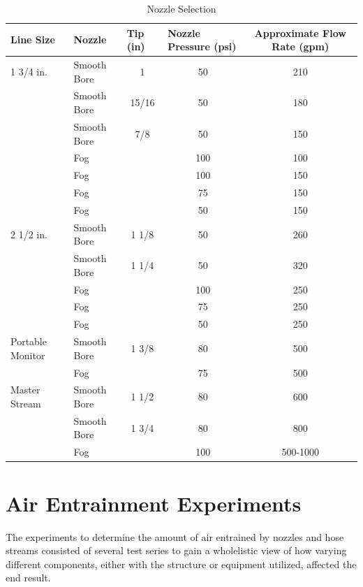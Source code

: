 \documentclass{article}
\begin{document}
\begin{table}[]
\centering
\begin{tabular}{|llccc|}
\hline
\multicolumn{1}{|l|}{\textbf{Line Size}} & \multicolumn{1}{l|}{\textbf{Nozzle}} & \multicolumn{1}{l|}{\textbf{Tip (in)}} & \multicolumn{1}{l|}{\textbf{Nozzle Pressure (psi)}} & \textbf{Approximate Flow Rate (gpm)} \\ \hline
1 3/4 in. & Smooth Bore & 1 & 50 & 210 \\
 & Smooth Bore & 15/16 & 50 & 180 \\
 & Smooth Bore & 7/8 & 50 & 150 \\
 & Fog &  & 100 & 100 \\
 & Fog &  & 100 & 150 \\
 & Fog &  & 75 & 150 \\
 & Fog &  & 50 & 150 \\ \hline
2 1/2 in. & Smooth Bore & 1 1/8 & 50 & 260 \\
 & Smooth Bore & 1 1/4 & 50 & 320 \\
 & Fog &  & 100 & 250 \\
 & Fog &  & 75 & 250 \\
 & Fog &  & 50 & 250 \\ \hline
Portable Monitor & Smooth Bore & 1 3/8 & 80 & 500 \\
 & Fog &  & 75 & 500 \\ \hline
Master Stream & Smooth Bore & 1 1/2 & 80 & 600 \\
 & Smooth Bore & 1 3/4 & 80 & 800 \\
 & Fog &  & 100 & 500-1000 \\ \hline
\end{tabular}
\caption{Nozzle Selection}
\label{Nozzle Selection}
\end{table}

\clearpage

\section{Air Entrainment Experiments}

The experiments to determine the amount of air entrained by nozzles and hose streams consisted of several test series to gain a wholelistic view of how varying different components, either with the structure or equipment utilized, affected the end result.

\end{document}
